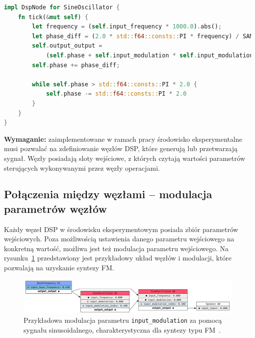 \begin{lstlisting}[language=Rust, caption=Implementacja węzła SineOscillator.,label={lst:sine_fm}]
impl DspNode for SineOscillator {
    fn tick(&mut self) {
        let frequency = (self.input_frequency * 1000.0).abs();
        let phase_diff = (2.0 * std::f64::consts::PI * frequency) / SAMPLE_RATE;
        self.output_output =
            (self.phase + self.input_modulation * self.input_modulation_index * 10.0).sin();
        self.phase += phase_diff;

        while self.phase > std::f64::consts::PI * 2.0 {
            self.phase -= std::f64::consts::PI * 2.0
        }
    }
}
\end{lstlisting}

\noindent
\textbf{Wymaganie:} zaimplementowane w ramach pracy środowisko eksperymentalne musi pozwalać na zdefiniowanie węzłów DSP, które generują lub
przetwarzają sygnał. Węzły posiadają sloty wejściowe, z których czytają wartości parametrów sterujących wykonywanymi 
przez węzły operacjami.

\subsection{Połączenia między węzłami -- modulacja parametrów węzłów}\label{sec:modulation_requirements}

Każdy węzeł DSP w środowisku eksperymentowym posiada zbiór parametrów wejściowych. Poza możliwością
ustawienia danego parametru wejściowego na konkretną wartość, możliwa jest też modulacja parametru
wejściowego. Na rysunku~\ref{fig:fm_mod_example} przedstawiony jest przykładowy układ węzłów i modulacji,
które pozwalają na uzyskanie syntezy FM\@.

\begin{figure}[H]\label{fig:fm_mod_example}
    \centering
    \includegraphics[width=1.0\linewidth]{rys05/fm_mod_example.png}
    \caption{
      Przykładowa modulacja parametru \texttt{input\_modulation} za pomocą
      sygnału sinusoidalnego, charakterystyczna dla syntezy typu
      FM~\cite{computational_music_synthesis}.
    }
\end{figure}

